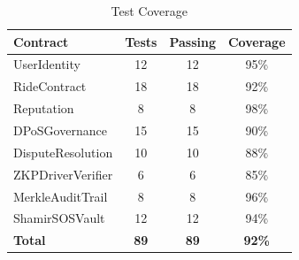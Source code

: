\begin{table}[H]
\centering
\caption{Test Coverage}
\begin{tabular}{|l|c|c|c|}
\hline
\textbf{Contract} & \textbf{Tests} & \textbf{Passing} & \textbf{Coverage} \\
\hline
UserIdentity & 12 & 12 & 95\% \\
RideContract & 18 & 18 & 92\% \\
Reputation & 8 & 8 & 98\% \\
DPoSGovernance & 15 & 15 & 90\% \\
DisputeResolution & 10 & 10 & 88\% \\
ZKPDriverVerifier & 6 & 6 & 85\% \\
MerkleAuditTrail & 8 & 8 & 96\% \\
ShamirSOSVault & 12 & 12 & 94\% \\
\hline
\textbf{Total} & \textbf{89} & \textbf{89} & \textbf{92\%} \\
\hline
\end{tabular}
\end{table}
